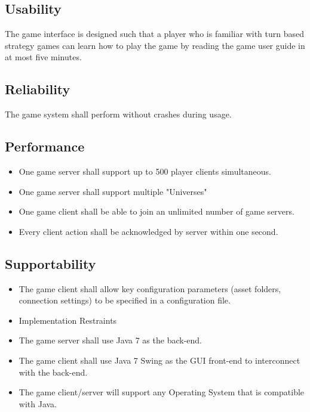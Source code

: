 \subsection{Usability}

The game interface is designed such that a player who is familiar with turn based strategy games can learn how to play the game by reading the game user guide in at most five minutes.

\subsection{Reliability}

The game system shall perform without crashes during usage.

\subsection{Performance}

\begin{itemize}
	\item One game server shall support up to 500 player clients simultaneous.
	\item One game server shall support multiple "Universes"
	\item One game client shall be able to join an unlimited number of game servers.
	\item Every client action shall be acknowledged by server within one second.
\end{itemize}

\subsection{Supportability}

\begin{itemize}
	\item The game client shall allow key configuration parameters (asset folders, connection settings) to be specified in a configuration file.
	\item Implementation Restraints
	\item The game server shall use Java 7 as the back-end.
	\item The game client shall use Java 7 Swing as the GUI front-end to interconnect with the back-end.
	\item The game client/server will support any Operating System that is compatible with Java.
\end{itemize}

